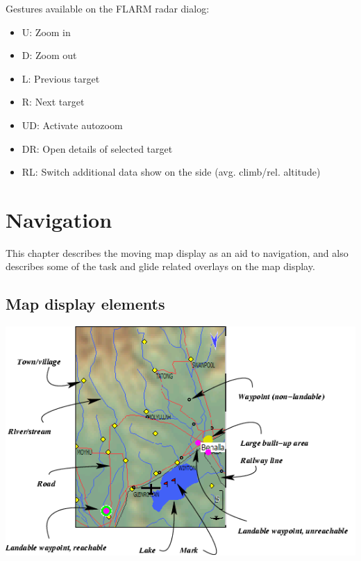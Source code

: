 \documentclass[a4paper,12pt]{refrep}
\begin{document}
  Gestures available on the FLARM radar dialog:
\begin{itemize}
\item U: Zoom in
\item D: Zoom out
\item L: Previous target
\item R: Next target
\item UD: Activate autozoom
\item DR: Open details of selected target
\item RL: Switch additional data show on the side (avg. climb/rel. altitude)
\end{itemize}

\chapter{Navigation}\label{cha:navigation}
This chapter describes the moving map display as an aid to navigation,
and also describes some of the task and glide related overlays on the
map display.

\section{Map display elements}

\begin{maxipage}
\includegraphics[angle=0,width=\linewidth,keepaspectratio='true']{figures/fig-map.png}
\end{maxipage}
\end{document}
